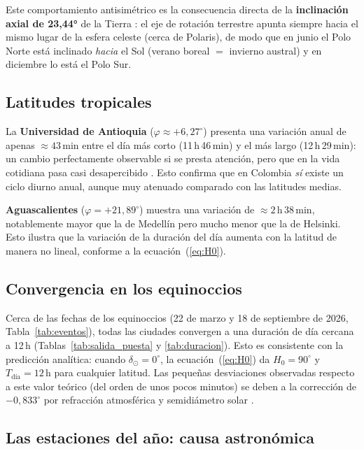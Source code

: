 Este comportamiento antisimétrico es la consecuencia directa de la
\textbf{inclinación axial de 23{,}44°} de la Tierra \citep{CarrollOstlie2017}:
el eje de rotación terrestre apunta siempre hacia el mismo lugar de la esfera celeste
(cerca de Polaris), de modo que en junio el Polo Norte está inclinado \emph{hacia} el
Sol (verano boreal $=$ invierno austral) y en diciembre lo está el Polo Sur.

\subsection{Latitudes tropicales}

La \textbf{Universidad de Antioquia} ($\varphi \approx +6{,}27^\circ$) presenta una
variación anual de apenas $\approx 43$\,min entre el día más corto (11\,h\,46\,min) y
el más largo (12\,h\,29\,min): un cambio perfectamente observable si se presta atención,
pero que en la vida cotidiana pasa casi desapercibido \citep{IDEAM2014}.
Esto confirma que en Colombia \emph{sí} existe un ciclo diurno anual, aunque muy
atenuado comparado con las latitudes medias.

\textbf{Aguascalientes} ($\varphi = +21{,}89^\circ$) muestra una variación de
$\approx 2$\,h\,38\,min, notablemente mayor que la de Medellín pero mucho menor que la
de Helsinki.
Esto ilustra que la variación de la duración del día aumenta con la latitud de manera
no lineal, conforme a la ecuación~(\ref{eq:H0}).

\subsection{Convergencia en los equinoccios}

Cerca de las fechas de los equinoccios (22 de marzo y 18 de septiembre de 2026,
Tabla~\ref{tab:eventos}), todas las ciudades convergen a una duración de día cercana
a 12\,h (Tablas~\ref{tab:salida_puesta} y \ref{tab:duracion}).
Esto es consistente con la predicción analítica: cuando $\delta_\odot = 0^\circ$,
la ecuación~(\ref{eq:H0}) da $H_0 = 90^\circ$ y $T_{\text{día}} = 12$\,h para cualquier
latitud.
Las pequeñas desviaciones observadas respecto a este valor teórico (del orden de unos
pocos minutos) se deben a la corrección de $-0{,}833^\circ$ por refracción atmosférica y
semidiámetro solar \citep{Meeus1998}.

\subsection{Las estaciones del año: causa astronómica}

